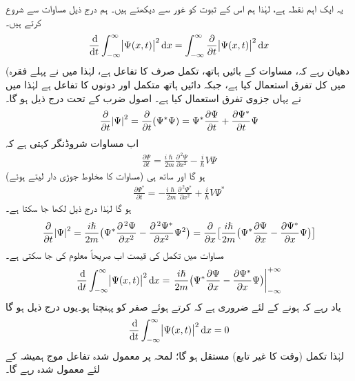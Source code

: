  یہ ایک اہم نقطہ ہے،  لہٰذا ہم اس کے ثبوت کو غور سے دیکھتے ہیں۔ ہم درج ذیل مساوات سے شروع کرتے ہیں۔
\begin{align}\label{مساوات_تفاعل_موج_الف}
\frac{\dif}{\dif t} \int_{-\infty}^{\infty} \abs{ \Psi (x , t)}^2 \dif x = \int_{- \infty}^{\infty} \frac{ \partial}{\partial t} \abs{ \Psi (x , t)}^2 \dif x 
\end{align}
(دھیان رہے  کہ، مساوات کے بائیں ہاتھ، تکمل صرف   کا تفاعل ہے،  لہٰذا میں نے پہلے فقرہ میں کل تفرق  استعمال کیا ہے، جبکہ دائیں ہاتھ متکمل  اور  دونوں کا تفاعل ہے لہٰذا میں نے یہاں جزوی تفرق  استعمال کیا ہے۔  اصول ضرب کے تحت درج ذیل ہو گا۔
\begin{align}
\frac{\partial}{\partial t}\abs{\Psi}^2=\frac{\partial}{\partial t}(\Psi^*\Psi)=\Psi^*\frac{\partial \Psi}{\partial t}+\frac{\partial \Psi^*}{\partial t}\Psi
\end{align}
اب مساوات شروڈنگر کہتی ہے کہ 
\begin{align}\label{مساوات_تفاعل_موج_شروڈنگر_تفرق_الف}
\frac{\partial \Psi}{\partial t}=\frac{i\hslash}{2m}\frac{\partial^{\,2}\Psi}{\partial x^2}-\frac{i}{\hslash}V\Psi
\end{align}
ہو گا اور ساتھ ہی  (مساوات  کا مخلوط جوڑی دار لیتے ہوئے) 
\begin{align}\label{مساوات_تفاعل_موج_آخر}
\frac{\partial \Psi^*}{\partial t}=-\frac{i\hslash}{2m}\frac{\partial^{\,2}\Psi^*}{\partial x^2}+\frac{i}{\hslash}V\Psi^*
\end{align}
ہو گا لہٰذا درج ذیل لکھا جا سکتا ہے۔
\begin{align}\label{مساوات_تفاعل_موج_صریحاً_تکمل_الف}
\frac{\partial}{\partial t}\abs{\Psi}^2=\frac{i\hslash}{2m}\big(\Psi^*\frac{\partial^{\,2} \Psi}{\partial x^2}-\frac{\partial^{\,2}\Psi^*}{\partial x^2}\Psi^2\big)=\frac{\partial}{\partial x}\big[\frac{i\hslash}{2m}\big(\Psi^*\frac{\partial \Psi}{\partial x}-\frac{\partial \Psi^*}{\partial x}\Psi\big)\big]
\end{align}
مساوات  میں تکمل کی قیمت اب  صریحاً معلوم کی جا سکتی ہے۔
\begin{align}
\frac{\dif}{\dif t}\int_{-\infty}^{\infty}\abs{\Psi(x,t)}^2\dif x=\left .\frac{i\hslash}{2m}\big(\Psi^*\frac{\partial \Psi}{\partial x}-\frac{\partial \Psi^*}{\partial x}\Psi\big)\right\vert_{-\infty}^{+\infty}
\end{align}
یاد رہے کہ    ہونے کے لئے ضروری ہے کہ  کرتے ہوئے  صفر کو پہنچتا  ہو۔یوں درج ذیل ہو گا
\begin{align}\label{مساوات_تفاعل_موج_تکمل_مستقل_ہو_گا}
\frac{\dif}{\dif t}\int_{-\infty}^{\infty}\abs{\Psi(x,t)}^2\dif x=0
\end{align}
لہٰذا تکمل (وقت کا غیر تابع) مستقل ہو گا؛ لمحہ  پر معمول شدہ تفاعل موج ہمیشہ کے لئے معمول شدہ رہے گا۔

